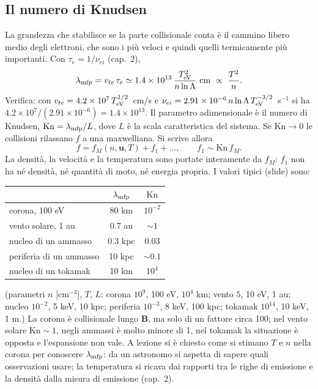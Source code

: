 \subsection{Il numero di Knudsen}
La grandezza che stabilisce se la parte collisionale conta è il cammino libero medio degli elettroni, che sono i più veloci e quindi quelli termicamente più importanti. Con $\tau_e=1/\nu_{ei}$ (cap.~2),
\begin{equation}
\lambda_{\rm mfp}=v_{te}\,\tau_e\simeq1.4\times10^{13}\,\frac{T_{\rm eV}^2}{n\ln\Lambda}\ \mathrm{cm}\ \propto\ \frac{T^2}{n}.
\end{equation}
Verifica: con $v_{te}=4.2\times10^7\,T_{\rm eV}^{1/2}$~cm/s e $\nu_{ei}=2.91\times10^{-6}\,n\ln\Lambda\,T_{\rm eV}^{-3/2}$~s$^{-1}$ si ha $4.2\times10^7/(2.91\times10^{-6})=1.4\times10^{13}$. Il parametro adimensionale è il numero di Knudsen, $\mathrm{Kn}=\lambda_{\rm mfp}/L$, dove $L$ è la scala caratteristica del sistema.
Se $\mathrm{Kn}\to0$ le collisioni rilassano $f$ a una maxwelliana. Si scrive allora
\begin{equation}
f=f_M(n,\mathbf{u},T)+f_1+\dots,\qquad f_1\sim\mathrm{Kn}\,f_M .
\end{equation}
La densità, la velocità e la temperatura sono portate interamente da $f_M$: $f_1$ non ha né densità, né quantità di moto, né energia propria. I valori tipici (slide) sono:
\begin{center}
\small
\begin{tabular}{|l|c|c|}
\hline
 & $\lambda_{\rm mfp}$ & $\mathrm{Kn}$\\
\hline
corona, 100 eV & 80 km & $10^{-2}$\\
\hline
vento solare, 1 au & 0.7 au & $\sim1$\\
\hline
nucleo di un ammasso & 0.3 kpc & 0.03\\
\hline
periferia di un ammasso & 10 kpc & $\sim0.1$\\
\hline
nucleo di un tokamak & 10 km & $10^4$\\
\hline
\end{tabular}
\end{center}
(parametri $n$ [cm$^{-3}$], $T$, $L$: corona $10^9$, 100 eV, $10^4$ km; vento $5$, 10 eV, 1 au; nucleo $10^{-2}$, 5 keV, 10 kpc; periferia $10^{-3}$, 8 keV, 100 kpc; tokamak $10^{14}$, 10 keV, 1 m.) La corona è collisionale lungo $\mathbf{B}$, ma solo di un fattore circa 100; nel vento solare $\mathrm{Kn}\sim1$, negli ammassi è molto minore di 1, nel tokamak la situazione è opposta e l'espansione non vale.
A lezione si è chiesto come si stimano $T$ e $n$ nella corona per conoscere $\lambda_{\rm mfp}$: da un astronomo si aspetta di sapere quali osservazioni usare; la temperatura si ricava dai rapporti tra le righe di emissione e la densità dalla misura di emissione (cap.~2).

